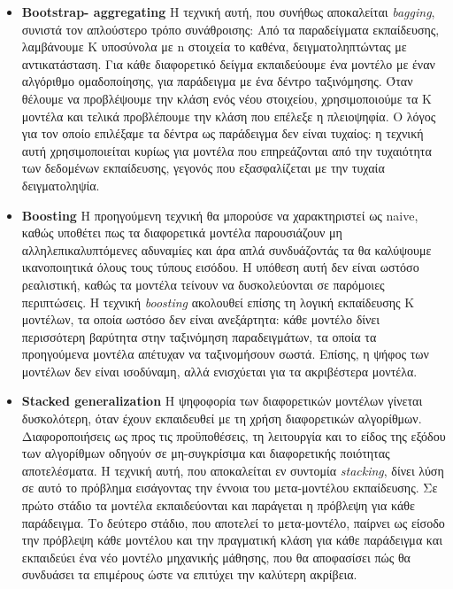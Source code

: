 \begin{itemize}
	\item \textbf{Bootstrap- aggregating} Η τεχνική αυτή, που συνήθως αποκαλείται \textit{bagging}, συνιστά τον απλούστερο τρόπο συνάθροισης: Από τα παραδείγματα εκπαίδευσης, λαμβάνουμε Κ υποσύνολα με n στοιχεία το καθένα, δειγματοληπτώντας με αντικατάσταση. Για κάθε διαφορετικό δείγμα εκπαιδεύουμε ένα μοντέλο με έναν αλγόριθμο ομαδοποίησης, για παράδειγμα με ένα δέντρο ταξινόμησης. Όταν θέλουμε να προβλέψουμε την κλάση ενός νέου στοιχείου, χρησιμοποιούμε τα Κ μοντέλα και τελικά προβλέπουμε την κλάση που επέλεξε η πλειοψηφία. Ο λόγος για τον οποίο επιλέξαμε τα δέντρα ως παράδειγμα δεν είναι τυχαίος: η τεχνική αυτή χρησιμοποιείται κυρίως για μοντέλα που επηρεάζονται από την τυχαιότητα των δεδομένων εκπαίδευσης, γεγονός που εξασφαλίζεται με την τυχαία δειγματοληψία.
	\item \textbf{Boosting} Η προηγούμενη τεχνική θα μπορούσε να χαρακτηριστεί ως naive, καθώς υποθέτει πως τα διαφορετικά μοντέλα παρουσιάζουν μη αλληλεπικαλυπτόμενες αδυναμίες και άρα απλά συνδυάζοντάς τα θα καλύψουμε ικανοποιητικά όλους τους τύπους εισόδου. Η υπόθεση αυτή δεν είναι ωστόσο ρεαλιστική, καθώς τα μοντέλα τείνουν να δυσκολεύονται σε παρόμοιες περιπτώσεις. Η τεχνική \textit{boosting} ακολουθεί επίσης τη λογική εκπαίδευσης Κ μοντέλων, τα οποία ωστόσο δεν είναι ανεξάρτητα: κάθε μοντέλο δίνει περισσότερη βαρύτητα στην ταξινόμηση παραδειγμάτων, τα οποία τα προηγούμενα μοντέλα απέτυχαν να ταξινομήσουν σωστά. Επίσης, η ψήφος των μοντέλων δεν είναι ισοδύναμη, αλλά ενισχύεται για τα ακριβέστερα μοντέλα.
	\item \textbf{Stacked generalization} Η ψηφοφορία των διαφορετικών μοντέλων γίνεται δυσκολότερη, όταν έχουν εκπαιδευθεί με τη χρήση διαφορετικών αλγορίθμων. Διαφοροποιήσεις ως προς τις προϋποθέσεις, τη λειτουργία και το είδος της εξόδου των αλγορίθμων οδηγούν σε μη-συγκρίσιμα  και διαφορετικής ποιότητας αποτελέσματα. Η τεχνική αυτή, που αποκαλείται εν συντομία \textit{stacking}, δίνει λύση σε αυτό το πρόβλημα εισάγοντας την έννοια του μετα-μοντέλου εκπαίδευσης. Σε πρώτο στάδιο τα μοντέλα εκπαιδεύονται και παράγεται η πρόβλεψη για κάθε παράδειγμα. Το δεύτερο στάδιο, που αποτελεί το μετα-μοντέλο, παίρνει ως είσοδο την πρόβλεψη κάθε μοντέλου και την πραγματική
	κλάση για κάθε παράδειγμα και εκπαιδεύει ένα νέο μοντέλο μηχανικής μάθησης, που θα αποφασίσει πώς θα συνδυάσει τα επιμέρους ώστε να επιτύχει την καλύτερη ακρίβεια.
\end{itemize}

